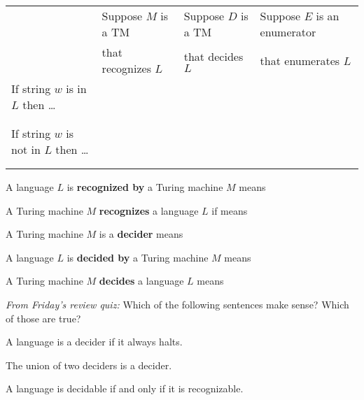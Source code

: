     

\begin{center}
    \begin{tabular}{|l|l|l|l|}
    \hline
    & Suppose $M$ is  a TM & Suppose $D$ is  a TM & Suppose $E$ is  an
    enumerator  \\
    &that  recognizes $L$  &that  decides $L$  &that enumerates $L$ \\
    \hline
    If string $w$ is in  $L$ then  \ldots  &&& \\
    &&&\\
    &&&\\
    If string $w$ is not in  $L$ then  \ldots  && &\\
    &&&\\
    &&&\\
    \hline
    \end{tabular}
\end{center}


A language $L$ is {\bf recognized by} a Turing machine $M$ means

\vspace{15pt}

A Turing  machine  $M$ {\bf  recognizes} a language $L$ if means

\vspace{15pt}

A Turing machine $M$ is a {\bf decider}  means

\vspace{15pt}

A language  $L$ is {\bf decided by} a Turing  machine  $M$  means

\vspace{15pt}

A  Turing machine $M$ {\bf decides} a language $L$ means

\vspace{15pt}


{\it From Friday's review quiz: }
Which of the following sentences make sense? Which of those are true?

A language is a decider if it always halts.

\vfill

The union of two deciders is a decider.

\vfill

A language is decidable if and only if it is recognizable.


